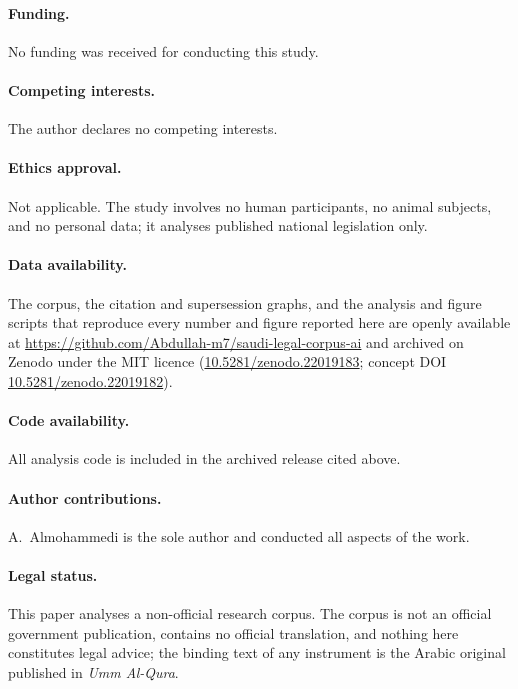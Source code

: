 \documentclass[sn-basic]{sn-jnl}%
\begin{document}
\paragraph{Funding.} No funding was received for conducting this study.

\paragraph{Competing interests.} The author declares no competing interests.

\paragraph{Ethics approval.} Not applicable. The study involves no human
participants, no animal subjects, and no personal data; it analyses
published national legislation only.

\paragraph{Data availability.} The corpus, the citation and supersession
graphs, and the analysis and figure scripts that reproduce every number and
figure reported here are openly available at
\url{https://github.com/Abdullah-m7/saudi-legal-corpus-ai} and archived on
Zenodo under the MIT licence
(\href{https://doi.org/10.5281/zenodo.22019183}{10.5281/zenodo.22019183};
concept DOI
\href{https://doi.org/10.5281/zenodo.22019182}{10.5281/zenodo.22019182}).

\paragraph{Code availability.} All analysis code is included in the archived
release cited above.

\paragraph{Author contributions.} A.~Almohammedi is the sole author and
conducted all aspects of the work.

\paragraph{Legal status.} This paper analyses a non-official research corpus.
The corpus is not an official government publication, contains no official
translation, and nothing here constitutes legal advice; the binding text of
any instrument is the Arabic original published in \emph{Umm Al-Qura}.
\fi
\end{document}
